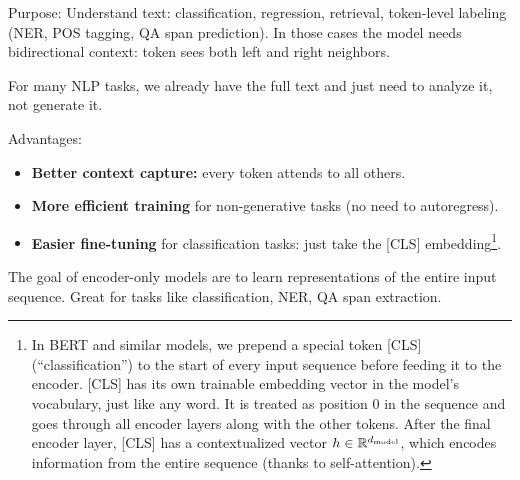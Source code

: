 \documentclass[11pt]{article}  %
\begin{document}
Purpose: Understand text: classification, regression, retrieval, token-level labeling (NER, POS tagging, QA span prediction). In those cases the model needs bidirectional context: token sees both left and right neighbors.

For many NLP tasks, we already have the full text and just need to analyze it, not generate it.

Advantages:
\begin{itemize}
  \item \textbf{Better context capture:} every token attends to all others.
  \item \textbf{More efficient training} for non-generative tasks (no need to autoregress).
  \item \textbf{Easier fine-tuning} for classification tasks: just take the [CLS] embedding\footnote{In BERT and similar models, we prepend a special token [CLS] (“classification”) to the start of every input sequence before feeding it to the encoder. [CLS] has its own trainable embedding vector in the model's vocabulary, just like any word. It is treated as position $0$ in the sequence and goes through all encoder layers along with the other tokens. After the final encoder layer, [CLS] has a contextualized vector $h \in \mathbb{R}^{d_{\text{model}}}$, which encodes information from the entire sequence (thanks to self-attention).}.
\end{itemize}

The goal of encoder-only models are to learn representations of the entire input sequence.
Great for tasks like classification, NER, QA span extraction.
\end{document}
